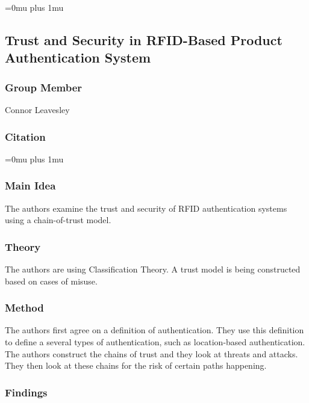 \Urlmuskip=0mu plus 1mu\relax


\noindent
\subsection{Trust and Security in RFID-Based Product Authentication System}

\subsubsection{Group Member}

\noindent
Connor Leavesley

\noindent
\subsubsection{Citation}

\Urlmuskip=0mu plus 1mu\relax

\subsubsection{Main Idea}

\noindent
The authors examine the trust and security of RFID authentication systems using a chain-of-trust model. 

\subsubsection{Theory}

\noindent
The authors are using Classification Theory. A trust model is being constructed based on cases of misuse. 

\subsubsection{Method}

\noindent
The authors first agree on a definition of authentication. They use this definition to define a several types of authentication, such as location-based authentication. The authors construct the chains of trust and they look at threats and attacks. They then look at these chains for the risk of certain paths happening. 

\subsubsection{Findings}

